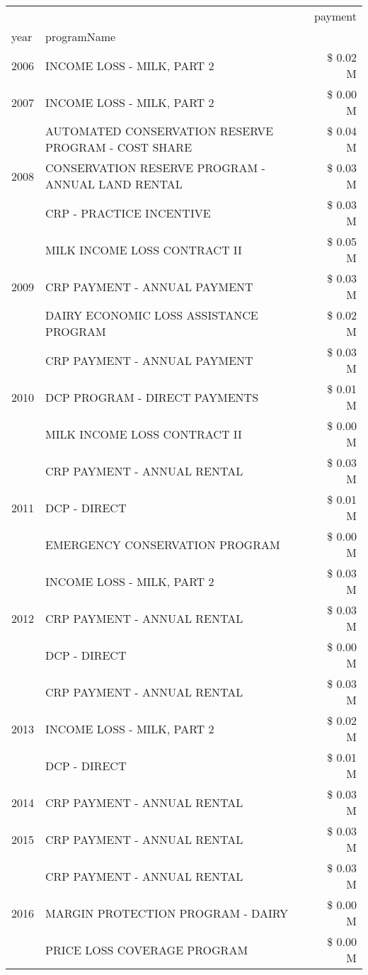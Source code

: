\begin{tabular}{llr}
\toprule
 &  & payment \\
year & programName &  \\
\midrule
2006 & INCOME LOSS - MILK, PART 2 & \$ 0.02 M \\
\cline{1-3}
2007 & INCOME LOSS - MILK, PART 2 & \$ 0.00 M \\
\cline{1-3}
\multirow[t]{3}{*}{2008} & AUTOMATED CONSERVATION RESERVE PROGRAM - COST SHARE & \$ 0.04 M \\
 & CONSERVATION RESERVE PROGRAM - ANNUAL LAND RENTAL & \$ 0.03 M \\
 & CRP - PRACTICE INCENTIVE & \$ 0.03 M \\
\cline{1-3}
\multirow[t]{3}{*}{2009} & MILK INCOME LOSS CONTRACT II & \$ 0.05 M \\
 & CRP PAYMENT - ANNUAL PAYMENT & \$ 0.03 M \\
 & DAIRY ECONOMIC LOSS ASSISTANCE PROGRAM & \$ 0.02 M \\
\cline{1-3}
\multirow[t]{3}{*}{2010} & CRP PAYMENT - ANNUAL PAYMENT & \$ 0.03 M \\
 & DCP PROGRAM - DIRECT PAYMENTS & \$ 0.01 M \\
 & MILK INCOME LOSS CONTRACT II & \$ 0.00 M \\
\cline{1-3}
\multirow[t]{3}{*}{2011} & CRP PAYMENT - ANNUAL RENTAL & \$ 0.03 M \\
 & DCP - DIRECT & \$ 0.01 M \\
 & EMERGENCY CONSERVATION PROGRAM & \$ 0.00 M \\
\cline{1-3}
\multirow[t]{3}{*}{2012} & INCOME LOSS - MILK, PART 2 & \$ 0.03 M \\
 & CRP PAYMENT - ANNUAL RENTAL & \$ 0.03 M \\
 & DCP - DIRECT & \$ 0.00 M \\
\cline{1-3}
\multirow[t]{3}{*}{2013} & CRP PAYMENT - ANNUAL RENTAL & \$ 0.03 M \\
 & INCOME LOSS - MILK, PART 2 & \$ 0.02 M \\
 & DCP - DIRECT & \$ 0.01 M \\
\cline{1-3}
2014 & CRP PAYMENT - ANNUAL RENTAL & \$ 0.03 M \\
\cline{1-3}
2015 & CRP PAYMENT - ANNUAL RENTAL & \$ 0.03 M \\
\cline{1-3}
\multirow[t]{3}{*}{2016} & CRP PAYMENT - ANNUAL RENTAL & \$ 0.03 M \\
 & MARGIN PROTECTION PROGRAM - DAIRY & \$ 0.00 M \\
 & PRICE LOSS COVERAGE PROGRAM & \$ 0.00 M \\

\end{tabular}
